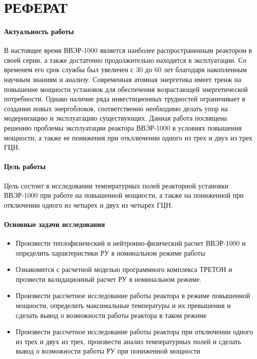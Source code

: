 \section*{РЕФЕРАТ}
%
\paragraph*{Актуальность работы} В настоящее время ВВЭР-1000 является наиболее распространенным реактором в своей серии, а также достаточно продолжительно находится в эксплуатации. Со временем его срок службы был увеличен с 30 до 60 лет благодаря накопленным научным знаниям и анализу. Современная атомная энергетика имеет тренж на повышение мощности установок для обеспечения возрастающей энергетической потребности. Однако наличие ряда инвестиционных трудностей ограничивает в создании новых энергоблоков, соответственно необходимо делать упор на модернизацию и эксплуатацию существующих. Данная работа посвящена решению проблемы эксплуатации реактора ВВЭР-1000 в условиях повышения мощности, а также ее понижения при откллючении одного из трех и двух из трех ГЦН.
\paragraph*{Цель работы}
Цель состоит в исследовании температурных полей реакторной установки ВВЭР-1000 при работе на повышенной мощности, а также на пониженной при отключении одного из четырех и двух из четырех ГЦН.
\paragraph*{Основные задачи исследования}
\begin{itemize}
    \item Произвести теплофизический и нейтронно-физический расчет ВВЭР-1000 и определить характеристики РУ в номинальном режиме работы 
    \item Ознакомится с расчетной моделью программного комплекса ТРЕТОН и прозвести валидационный расчет РУ в номинальном режиме.
    \item Произвести рассчетное исследование работы реактора в режиме повышенной мощности, определить максимальные температуры и их превышения и сделать вывод о возможности работы реактора в таком режиме
    \item Произвести рассчетное исследование работы реактора при отключении одного из трех и двух из трех, произвести анализ температурных полей и сделать вывод о возможности работы РУ при пониженной мощности
\end{itemize}
